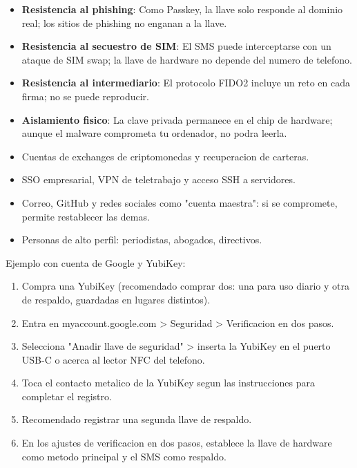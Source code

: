 
\begin{itemize}
  \item \textbf{Resistencia al phishing}: Como Passkey, la llave solo responde al dominio real; los sitios de phishing no enganan a la llave.
  \item \textbf{Resistencia al secuestro de SIM}: El SMS puede interceptarse con un ataque de SIM swap; la llave de hardware no depende del numero de telefono.
  \item \textbf{Resistencia al intermediario}: El protocolo FIDO2 incluye un reto en cada firma; no se puede reproducir.
  \item \textbf{Aislamiento fisico}: La clave privada permanece en el chip de hardware; aunque el malware comprometa tu ordenador, no podra leerla.
\end{itemize}


\begin{itemize}
  \item Cuentas de exchanges de criptomonedas y recuperacion de carteras.
  \item SSO empresarial, VPN de teletrabajo y acceso SSH a servidores.
  \item Correo, GitHub y redes sociales como "cuenta maestra": si se compromete, permite restablecer las demas.
  \item Personas de alto perfil: periodistas, abogados, directivos.
\end{itemize}


Ejemplo con cuenta de Google y YubiKey:

\begin{enumerate}
  \item Compra una YubiKey (recomendado comprar dos: una para uso diario y otra de respaldo, guardadas en lugares distintos).
  \item Entra en myaccount.google.com > Seguridad > Verificacion en dos pasos.
  \item Selecciona "Anadir llave de seguridad" > inserta la YubiKey en el puerto USB-C o acerca al lector NFC del telefono.
  \item Toca el contacto metalico de la YubiKey segun las instrucciones para completar el registro.
  \item Recomendado registrar una segunda llave de respaldo.
  \item En los ajustes de verificacion en dos pasos, establece la llave de hardware como metodo principal y el SMS como respaldo.
\end{enumerate}

